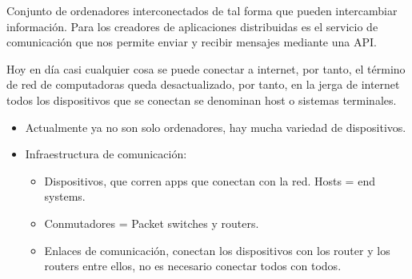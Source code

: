 \documentclass[12pt, twoside, openright]{report} %
\begin{document}
Conjunto de ordenadores interconectados de tal forma que pueden
intercambiar información. Para los creadores de aplicaciones
distribuidas es el servicio de comunicación que nos permite enviar y
recibir mensajes mediante una API.

Hoy en día casi cualquier cosa se puede conectar a internet, por
tanto, el término de red de computadoras queda desactualizado, por
tanto, en la jerga de internet todos los dispositivos que se conectan
se denominan host o sistemas terminales.

\begin{itemize}
	\item Actualmente ya no son solo ordenadores, hay mucha variedad de
	      dispositivos.
	\item Infraestructura de comunicación:

	      \begin{itemize}
		      \item Dispositivos, que corren apps que conectan con la red. Hosts = end
		            systems.
		      \item Conmutadores = Packet switches y routers.
		      \item Enlaces de comunicación, conectan los dispositivos con los router
		            y los routers entre ellos, no es necesario conectar todos con
		            todos.


\end{itemize}
\end{itemize}
\end{document}
